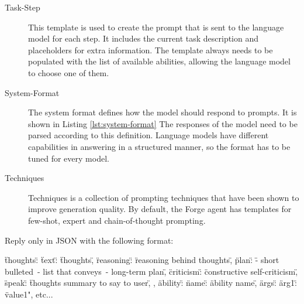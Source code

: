 \documentclass[../main.tex]{subfiles}
\begin{document}
\begin{description}
      \item[Task-Step] This template is used to create the prompt that is sent to the language model for each step.
            It includes the current task description and placeholders for extra information.
            The template always needs to be populated with the list of available abilities,
            allowing the language model to choose one of them.
      \item[System-Format] The system format defines how the model should respond to prompts.
            It is shown in Listing \ref{lst:system-format}
            The responses of the model need to be parsed according to this definition.
            Language models have different capabilities in answering in a structured manner, %
            so the format has to be tuned for every model.
      \item[Techniques] Techniques is a collection of prompting techniques that have been shown to improve generation quality.
            By default, the Forge agent has templates for few-shot, expert and chain-of-thought prompting. %
\end{description}

\begin{Code}[
      caption={The system format of the Forge agent.
                  The language model is asked to only answer in this format.
                  The thoughts before creating the output for the user (speak),
                  the LLM generates reasoning, a plan and criticism.
                  After the model generated its thoughts,
                  it generates an ability proposal with the corresponding arguments.},
      label={lst:system-format},
      captionpos=b,
      float=tp]
      Reply only in JSON with the following format:

      {
            \"thoughts\": {
                  \"text\":  \"thoughts\",
                  \"reasoning\": \"reasoning behind thoughts\",
                  \"plan\": \"- short bulleted\
                              - list that conveys\
                              - long-term plan\",
                  \"criticism\": \"constructive self-criticism\",
                  \"speak\": \"thoughts summary to say to user\",
            },
            \"ability\": {
                  \"name\": \"ability name\",
                  \"args\": {
                        \"arg1\": \"value1", etc...
                  }
            }
      }
\end{Code}
\end{document}

